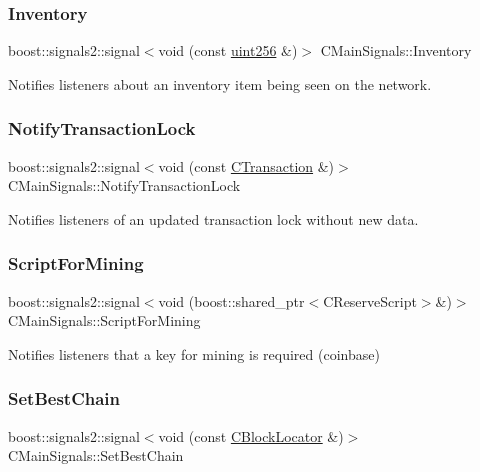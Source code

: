 \subsubsection{\texorpdfstring{Inventory}{Inventory}}
{\footnotesize\ttfamily boost\+::signals2\+::signal$<$void (const \mbox{\hyperlink{classuint256}{uint256}} \&)$>$ C\+Main\+Signals\+::\+Inventory}

Notifies listeners about an inventory item being seen on the network. \mbox{\label{struct_c_main_signals_a8323c4bfc6811c30abd2e3ff8aacbbaf}} 
\subsubsection{\texorpdfstring{Notify\+Transaction\+Lock}{NotifyTransactionLock}}
{\footnotesize\ttfamily boost\+::signals2\+::signal$<$void (const \mbox{\hyperlink{class_c_transaction}{C\+Transaction}} \&)$>$ C\+Main\+Signals\+::\+Notify\+Transaction\+Lock}

Notifies listeners of an updated transaction lock without new data. \mbox{\label{struct_c_main_signals_a459b58e6ee3b3c064439c665cfc8b28d}} 
\subsubsection{\texorpdfstring{Script\+For\+Mining}{ScriptForMining}}
{\footnotesize\ttfamily boost\+::signals2\+::signal$<$void (boost\+::shared\+\_\+ptr$<$C\+Reserve\+Script$>$\&)$>$ C\+Main\+Signals\+::\+Script\+For\+Mining}

Notifies listeners that a key for mining is required (coinbase) \mbox{\label{struct_c_main_signals_a11f2f18522ff7aa672eb5cc8c1f397b2}} 
\subsubsection{\texorpdfstring{Set\+Best\+Chain}{SetBestChain}}
{\footnotesize\ttfamily boost\+::signals2\+::signal$<$void (const \mbox{\hyperlink{struct_c_block_locator}{C\+Block\+Locator}} \&)$>$ C\+Main\+Signals\+::\+Set\+Best\+Chain}

